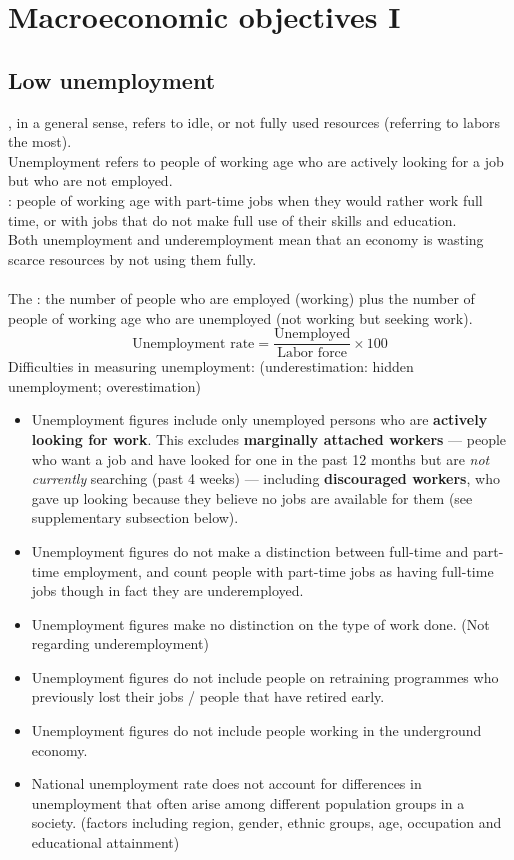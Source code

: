 \section{Macroeconomic objectives I}
\subsection{Low unemployment}
, in a general sense, refers to idle, or not fully used resources (referring to labors the most). \\
Unemployment refers to people of working age who are actively looking for a job but who are not employed.\\
: people of working age with part-time jobs when they would rather work full time, or with jobs that do not make full use of their skills and education. \\
Both unemployment and underemployment mean that an economy is wasting scarce resources by not using them fully.\\\\
The : the number of people who are employed (working) plus the number of people of working age who are unemployed (not working but seeking work).
\[\text{Unemployment rate}=\dfrac{\text{Unemployed}}{\text{Labor force}}\times 100\]
Difficulties in measuring unemployment: (underestimation: hidden unemployment; overestimation)
\begin{itemize}
  \item Unemployment figures include only unemployed persons who are \textbf{actively looking for work}. This excludes \textbf{marginally attached workers} --- people who want a job and have looked for one in the past 12 months but are \textit{not currently} searching (past 4 weeks) --- including \textbf{discouraged workers}, who gave up looking because they believe no jobs are available for them (see supplementary subsection below).
  \item Unemployment figures do not make a distinction between full-time and part-time employment, and count people with part-time jobs as having full-time jobs though in fact they are underemployed.
  \item Unemployment figures make no distinction on the type of work done. (Not regarding underemployment)
  \item Unemployment figures do not include people on retraining programmes who previously lost their jobs / people that have retired early.
  \item Unemployment figures do not include people working in the underground economy.
  \item National unemployment rate does not account for differences in unemployment that often arise among different population groups in a society. (factors including region, gender, ethnic groups, age, occupation and educational attainment)
\end{itemize}
